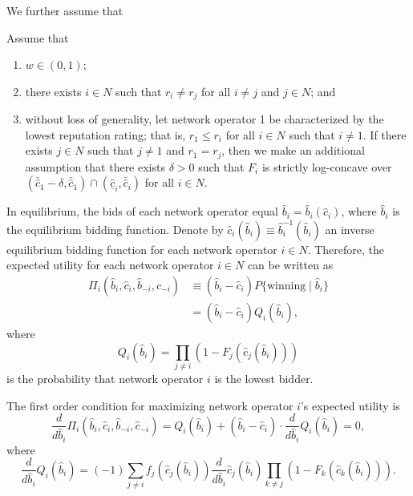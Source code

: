 We further assume that
\begin{assumptions}
\label{ass:assumptions_generic_indirect}
Assume that
\begin{enumerate}
  \item $w\in(0,1)$;
  \item there exists $i\in N$ such that $r_i\neq r_j$ for all $i\neq j$ and $j\in N$; and
  \item without loss of generality, let network operator 1 be characterized by the lowest reputation rating; that is, $r_1 \leq r_i$ for all $i\in N$ such that $i\neq 1$. If there exists $j\in N$ such that $j\neq 1$ and $r_1 = r_j$, then we make an additional assumption that there exists $\delta > 0$ such that $F_i$ is strictly log-concave over $(\bar{\hat{c}}_1 - \delta, \bar{\hat{c}}_1)\cap (\underline{\hat{c}}_i, \bar{\hat{c}}_i)$ for all $i\in N$.
\end{enumerate}
\end{assumptions}

In equilibrium, the bids of each network operator equal $\hat{b}_i = \hat{b}_i(\hat{c}_i)$, where $\hat{b}_i$ is the equilibrium bidding function. Denote by $\hat{c}_i(\hat{b}_i)\equiv \hat{b}_i^{-1}(\hat{b}_i)$ an inverse equilibrium bidding function for each network operator $i\in N$. Therefore, the expected utility for each network operator $i\in N$ can be written as
\begin{align*}
  \Pi_i(\hat{b}_i,\hat{c}_i,\hat{b}_{-i},\hat{c}_{-i})
  &\equiv (\hat{b}_i - \hat{c}_i)P\{\text{winning}\mid\hat{b}_i\}\\
  &= (\hat{b}_i - \hat{c}_i)Q_i(\hat{b}_i),
\end{align*}
where
\begin{equation*}
Q_i(\hat{b}_i) = \prod_{j\neq i}\left( 1 - F_j(\hat{c}_j(\hat{b}_i)) \right)
\end{equation*}
is the probability that network operator $i$ is the lowest bidder.

The first order condition for maximizing network operator $i$'s expected utility is
\begin{equation}
  \label{eq:foc_indirect}
  \frac{d}{d\hat{b}_i}\Pi_i(\hat{b}_i,\hat{c}_i,\hat{b}_{-i},\hat{c}_{-i}) = Q_i(\hat{b}_i) + (\hat{b}_i - \hat{c}_i)\cdot\frac{d}{d\hat{b}_i}Q_i(\hat{b}_i) = 0,
\end{equation}
where
\begin{equation*}
  \frac{d}{d\hat{b}_i}Q_i(\hat{b}_i) = (-1)\sum_{j\neq i} f_j(\hat{c}_j(\hat{b}_i))\frac{d}{d\hat{b}_i}\hat{c}_j(\hat{b}_i)\prod_{k\neq j} \left( 1 - F_k(\hat{c}_k(\hat{b}_i)) \right).
\end{equation*}

